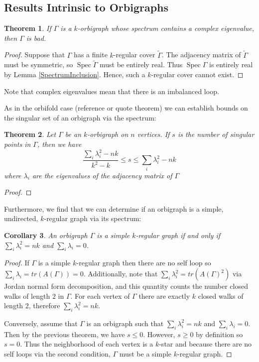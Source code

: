 \documentclass[12pt]{article}
\theoremstyle{plain}
\newtheorem{theorem}{Theorem}
\newtheorem{corollary}[theorem]{Corollary}
\theoremstyle{definition}
\theoremstyle{remark}
\DeclareMathOperator*{\spec}{Spec}
\begin{document}
  \subsection{Results Intrinsic to Orbigraphs}

    \begin{theorem}\label{ComplexEigenvalues}
      If $\Gamma$ is a $k$-orbigraph whose spectrum contains a complex eigenvalue, then $\Gamma$ is bad.
    \end{theorem}
    \begin{proof}
      Suppose that $\Gamma$ has a finite $k$-regular cover $\widetilde{\Gamma}$. The adjacency matrix of $\widetilde{\Gamma}$ must be symmetric, so $\spec{\widetilde{\Gamma}}$ must be entirely real. Thus $\spec{\Gamma}$ is entirely real by Lemma \ref{SpectrumInclusion}. Hence, such a $k$-regular cover cannot exist.
    \end{proof}

    Note that complex eigenvalues mean that there is an imbalanced loop.

    As in the orbifold case (reference or quote theorem) we can establish bounds on the singular set of an orbigraph via the spectrum:

    \begin{theorem}\label{SingularBounds}
      Let $\Gamma$ be an $k$-orbigraph on $n$ vertices. If $s$ is the number of singular points in $\Gamma$, then we have
      $$
        \frac{\sum_{i} \lambda_i^2 - n k}{k^2 - k} \le s \le \sum_{i} \lambda_i^2 - n k
      $$
      where $\lambda_i$ are the eigenvalues of the adjacency matrix of $\Gamma$
    \end{theorem}
    \begin{proof}
      
    \end{proof}

    Furthermore, we find that we can determine if an orbigraph is a simple, undirected, $k$-regular graph via its spectrum:
    \begin{corollary}
      An orbigraph $\Gamma$ is a simple $k$-regular graph if and only if $\sum_{i} \lambda_i^2 = n k$ and $\sum_{i} \lambda_i = 0$.
    \end{corollary}
    \begin{proof}
      If $\Gamma$ is a simple $k$-regular graph then there are no self loop so $\sum_{i} \lambda_i = tr(A(\Gamma)) = 0$. Additionally, note that $\sum_{i} \lambda_i^2 = tr(A(\Gamma)^2)$ via Jordan normal form decomposition, and this quantity counts the number closed walks of length $2$ in $\Gamma$. For each vertex of $\Gamma$ there are exactly $k$ closed walks of length $2$, therefore $\sum_{i} \lambda_i^2 = n k$. 

      Conversely, assume that $\Gamma$ is an orbigraph such that $\sum_{i} \lambda_i^2 = n k$ and $\sum_{i} \lambda_i = 0$. Then by the previous theorem, we have $s \le 0$. However, $s \ge 0$ by definition so $s = 0$. Thus the neighborhood of each vertex is a $k$-star and because there are no self loops via the second condition, $\Gamma$ must be a simple $k$-regular graph.
    \end{proof}
\end{document}
